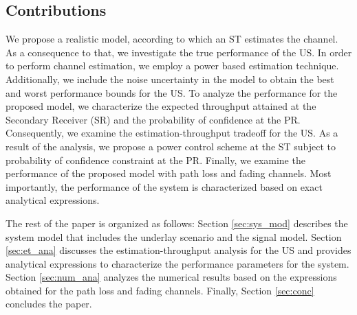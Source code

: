 \documentclass[conference, twocolumn]{IEEEtran}
\newcommand{\e}[2]{{\mathbb E}_{#1}\left[ #2 \right]}
\newcommand{\sub}[1]{_{\text{#1}}}
\newcommand{\pc}{\text{P}\sub{c}}
\newcommand{\imp}{\uline}
\begin{document}
\subsection{Contributions}
We propose a realistic model, according to which an ST estimates the channel. As a consequence to that, we investigate the true performance of the US. 
In order to perform channel estimation, we employ a power based estimation technique. Additionally, we include the noise uncertainty in the model to obtain the best and worst performance bounds for the US. 
To analyze the performance for the proposed model, we characterize the expected throughput attained at the Secondary Receiver (SR) and the probability of confidence at the PR. Consequently, we examine the estimation-throughput tradeoff for the US. As a result of the analysis, we propose a power control scheme at the ST subject to probability of confidence constraint at the PR. 
Finally, we examine the performance of the proposed model with path loss and fading channels. Most importantly, the performance of the system is characterized based on exact analytical expressions.

The rest of the paper is organized as follows: Section \ref{sec:sys_mod} describes the system model that includes the underlay scenario and the signal model. Section \ref{sec:et_ana} discusses the estimation-throughput analysis for the US and provides analytical expressions to characterize the performance parameters for the system. Section \ref{sec:num_ana} analyzes the numerical results based on the expressions obtained for the path loss and fading channels. Finally, Section \ref{sec:conc} concludes the paper. 
\end{document}
